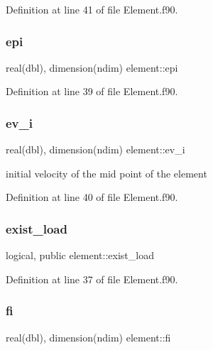Definition at line 41 of file Element.\+f90.

\mbox{\label{namespaceelement_afd7049cf1988fff1d20ea9fae6290b27}} 
\subsubsection{\texorpdfstring{epi}{epi}}
{\footnotesize\ttfamily real(dbl), dimension(ndim) element\+::epi\hspace{0.3cm}{\ttfamily [private]}}



Definition at line 39 of file Element.\+f90.

\mbox{\label{namespaceelement_a38ecc4368e8e51d5672ad47f1a79536e}} 
\subsubsection{\texorpdfstring{ev\+\_\+i}{ev\_i}}
{\footnotesize\ttfamily real(dbl), dimension(ndim) element\+::ev\+\_\+i\hspace{0.3cm}{\ttfamily [private]}}



initial velocity of the mid point of the element 



Definition at line 40 of file Element.\+f90.

\mbox{\label{namespaceelement_a4fecf0570d257bca42bf4ece885f4721}} 
\subsubsection{\texorpdfstring{exist\+\_\+load}{exist\_load}}
{\footnotesize\ttfamily logical, public element\+::exist\+\_\+load}



Definition at line 37 of file Element.\+f90.

\mbox{\label{namespaceelement_aa97de262111f37b6e4b721cad221946a}} 
\subsubsection{\texorpdfstring{fi}{fi}}
{\footnotesize\ttfamily real(dbl), dimension(ndim) element\+::fi\hspace{0.3cm}{\ttfamily [private]}}



